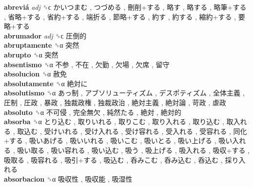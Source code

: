 \textbf{abreviá} \emph{adj}  ␝ϲ   かいつまむ ,  つづめる ,  刪削+する ,  略す ,  略する ,  略筆+する ,  省略+する ,  省約+する ,  端折る ,  節略+する ,  約す ,  約する ,  縮約+する ,  要略+する   \\
\textbf{abrumador} \emph{adj}  ␝ϲ   圧倒的   \\
\textbf{abruptamente} ␝α   突然   \\
\textbf{abrupto} ␝α   突然   \\
\textbf{absentismo} ␝α   不参 ,  不在 ,  欠勤 ,  欠場 ,  欠席 ,  留守   \\
\textbf{absolucion} ␝α   赦免   \\
\textbf{absolutamente} ␝α   絶対に   \\
\textbf{absolutismo} ␝α   あっ制 ,  アブソリューティズム ,  デスポティズム ,  全体主義 ,  圧制 ,  圧政 ,  暴政 ,  独裁政権 ,  独裁政治 ,  絶対主義 ,  絶対論 ,  苛政 ,  虐政   \\
\textbf{absoluto} ␝α   不可侵 ,  完全無欠 ,  純然たる ,  絶対 ,  絶対的   \\
\textbf{absorba} ␝α   とり込む ,  取りいれる ,  取りこむ ,  取り入れる ,  取り込む ,  取入れる ,  取込む ,  受けいれる ,  受け入れる ,  受け容れる ,  受入れる ,  受容れる ,  同化+する ,  吸いあげる ,  吸いいれる ,  吸いこむ ,  吸いとる ,  吸い上げる ,  吸い入れる ,  吸い取る ,  吸い容れる ,  吸い込む ,  吸う ,  吸上げる ,  吸入れる ,  吸収+する ,  吸取る ,  吸容れる ,  吸引+する ,  吸込む ,  呑みこむ ,  呑み込む ,  呑込む ,  採り入れる   \\
\textbf{absorbacion} ␝α   吸収性 ,  吸収能 ,  吸湿性   \\
